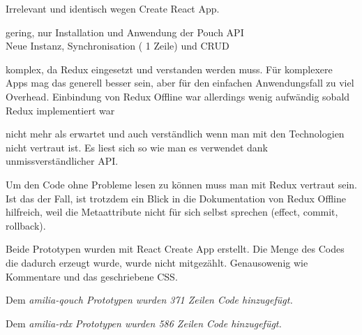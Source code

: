 Irrelevant und identisch wegen Create React App.

%
\begin{description}[leftmargin=0.5cm,style=nextline]
  \item[amilia-qouch]
  gering, nur Installation und Anwendung der Pouch API\\
  Neue Instanz, Synchronisation ( 1 Zeile) und CRUD
  \item[amilia-rdx]
  komplex, da Redux eingesetzt und verstanden werden muss. Für komplexere Apps mag das generell besser sein, aber für den einfachen Anwendungsfall zu viel Overhead. Einbindung von Redux Offline war allerdings wenig aufwändig sobald Redux implementiert war
\end{description}
%
\begin{description}[leftmargin=0.5cm,style=nextline]
  \item[amilia-qouch]
  nicht mehr als erwartet und auch verständlich wenn man mit den Technologien nicht vertraut ist. Es liest sich so wie man es verwendet dank unmissverständlicher API.
  \item[amilia-rdx] 
  Um den Code ohne Probleme lesen zu können muss man mit Redux vertraut sein. Ist das der Fall, ist trotzdem ein Blick in die Dokumentation von Redux Offline hilfreich, weil die Metaattribute nicht für sich selbst sprechen (effect, commit, rollback).
\end{description}
%
  Beide Prototypen wurden mit React Create App erstellt. Die Menge des Codes die dadurch erzeugt wurde, wurde nicht mitgezählt. Genausowenig wie Kommentare und das geschriebene \gls{CSS}.
  \begin{description}[leftmargin=0.5cm,style=nextline]
    \item[amilia-qouch]
    Dem \it{amilia-qouch} Prototypen wurden 371 Zeilen Code hinzugefügt.
    \item[amilia-rdx] 
    Dem \it{amilia-rdx} Prototypen wurden 586 Zeilen Code hinzugefügt.
\end{description}

